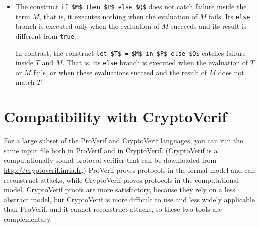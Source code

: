 \documentclass{book}
\begin{document}
\begin{itemize}
\begin{lstlisting}[numbers=none]
    let (=c, x) = $M$ in ...
\end{lstlisting}
The pattern \lstinline!(=c, x)! matches pairs whose first component
is equal to \lstinline!c!.
If you want to refer to a data function without argument, the following
syntax is also possible:
\begin{lstlisting}[numbers=none]
    const c: bitstring [data].

    let (c(), x) = $M$ in ...
\end{lstlisting}

\item The construct \lstinline!if $M$ then $P$ else $Q$! does not catch
failure inside the term $M$, that is, it executes nothing when the evaluation of
$M$ fails. Its \lstinline!else! branch is executed only when the evaluation
of $M$ succeeds and its result is different from \lstinline!true!.

In contrast, the construct \lstinline!let $T$ = $M$ in $P$ else $Q$!
catches failure inside $T$ and $M$. That is, its \lstinline!else!
branch is executed when the evaluation of $T$ or $M$ fails, or
when these evaluations succeed and the result of $M$ does not match
$T$.

\end{itemize}

\section{Compatibility with CryptoVerif}\label{sec:cryptoverif}

For a large subset of the ProVerif and CryptoVerif languages,
you can run the same input file both in ProVerif and in CryptoVerif.
(CryptoVerif is a
computationally-sound protocol verifier that can be downloaded from
\url{http://cryptoverif.inria.fr}.) ProVerif proves protocols in the formal
model and can reconstruct attacks, while CryptoVerif proves protocols
in the computational model. CryptoVerif proofs are more satisfactory,
because they rely on a less abstract model, but CryptoVerif is more
difficult to use and less widely applicable than ProVerif,
and it cannot reconstruct attacks, so these two tools are complementary.
\end{document}
